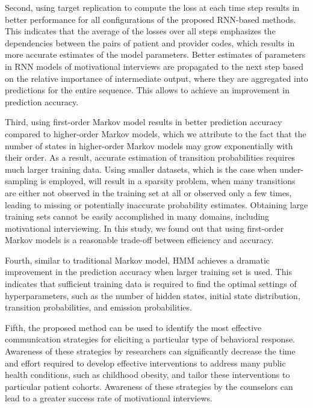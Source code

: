 \documentclass{amia_summit_2018}
\begin{document}
Second, using target replication to compute the loss at each time step results in better performance for all configurations of the proposed RNN-based methods. This indicates that the average of the losses over all steps emphasizes the dependencies between the pairs of patient and provider codes, which results in more accurate estimates of the model parameters. Better estimates of parameters in RNN models of motivational interviews are propagated to the next step based on the relative importance of intermediate output, where they are aggregated into predictions for the entire sequence. This allows to achieve an improvement in prediction accuracy.

Third, using first-order Markov model results in better prediction accuracy compared to higher-order Markov models, which we attribute to the fact that the number of states in higher-order Markov models may grow exponentially with their order. As a result, accurate estimation of transition probabilities requires much larger training data. Using smaller datasets, which is the case when under-sampling is employed, will result in a sparsity problem, when many transitions are either not observed in the training set at all or observed only a few times, leading to missing or potentially inaccurate probability estimates. Obtaining large training sets cannot be easily accomplished in many domains, including motivational interviewing. In this study, we found out that using first-order Markov models is a reasonable trade-off between efficiency and accuracy.

Fourth, similar to traditional Markov model, HMM achieves a dramatic improvement in the prediction accuracy when larger training set is used. This indicates that sufficient training data is required to find the optimal settings of hyperparameters, such as the number of hidden states, initial state distribution, transition probabilities, and emission probabilities.   
 
Fifth, the proposed method can be used to identify the most effective communication strategies for eliciting a particular type of behavioral response. Awareness of these strategies by researchers can significantly decrease the time and effort required to develop effective interventions to address many public health conditions, such as childhood obesity, and tailor these interventions to particular patient cohorts. Awareness of these strategies by the counselors can lead to a greater success rate of motivational interviews.     
 
\end{document}

